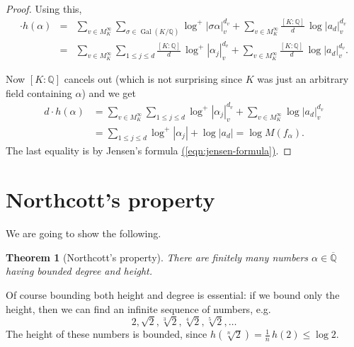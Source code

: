 \documentclass{article}
\newcommand{\eqnref}[1]{\hyperref[#1]{(\ref*{#1})}}
\newtheorem{theorem}[proposition]{Theorem}
\theoremstyle{definition}
\DeclareMathOperator{\Gal}{Gal}
\newcommand{\QQ}{\mathbb{Q}}
\begin{document}
\begin{proof}
  Using this,
  \begin{eqnarray*}
    [K : \QQ] \cdot h (\alpha) & = & \sum_{v \in M_K^\infty} \sum_{\sigma \in \Gal (K/\QQ)} \log^+ |\sigma \alpha|_v^{d_v} + \sum_{v\in M_K^\infty} \frac{[K : \QQ]}{d} \, \log |a_d|_v^{d_v} \\
                               & = & \sum_{v \in M_K^\infty} \sum_{1 \le j \le d} \frac{[K : \QQ]}{d}\, \log^+ |\alpha_j|_v^{d_v} + \sum_{v\in M_K^\infty} \frac{[K : \QQ]}{d} \, \log |a_d|_v^{d_v}.
  \end{eqnarray*}

  Now $[K : \QQ]$ cancels out (which is not surprising since $K$ was just an
  arbitrary field containing $\alpha$) and we get
  \begin{align*}
    d\cdot h(\alpha) & = \sum_{v \in M_K^\infty} \sum_{1 \le j \le d} \log^+ |\alpha_j|_v^{d_v} + \sum_{v\in M_K^\infty} \log |a_d|_v^{d_v} \\
                     & = \sum_{1 \le j \le d} \log^+ |\alpha_j| + \log |a_d| = \log M (f_\alpha).
  \end{align*}
  The last equality is by Jensen's formula \eqnref{eqn:jensen-formula}.
\end{proof}

\section{Northcott's property}
\label{section:Northcott}

We are going to show the following.

\begin{theorem}[Northcott's property]
  \label{theorem:northcott-for-numbers}
  There are finitely many numbers $\alpha \in \overline{\QQ}$ having bounded
  degree and height.
\end{theorem}

Of course bounding both height and degree is essential: if we bound only the
height, then we can find an infinite sequence of numbers, e.g.
\[ 2, \sqrt{2}, \sqrt[3]{2}, \sqrt[4]{2}, \sqrt[5]{2}, \ldots \]
The height of these numbers is bounded, since
$h (\sqrt[n]{2}) = \frac{1}{n} \, h (2) \le \log 2$.
\end{document}
